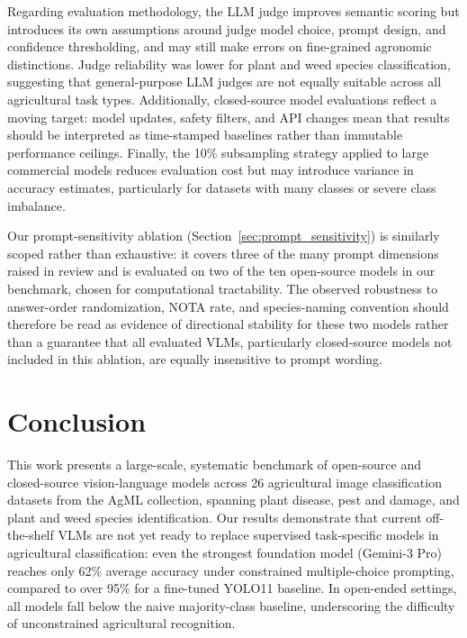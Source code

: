 \documentclass[10pt,letterpaper]{article}
\begin{document}
Regarding evaluation methodology, the LLM judge improves semantic scoring but introduces its own assumptions around judge model choice, prompt design, and confidence thresholding, and may still make errors on fine-grained agronomic distinctions. Judge reliability was lower for plant and weed species classification, suggesting that general-purpose LLM judges are not equally suitable across all agricultural task types. Additionally, closed-source model evaluations reflect a moving target: model updates, safety filters, and API changes mean that results should be interpreted as time-stamped baselines rather than immutable performance ceilings. Finally, the 10\% subsampling strategy applied to large commercial models reduces evaluation cost but may introduce variance in accuracy estimates, particularly for datasets with many classes or severe class imbalance.

Our prompt-sensitivity ablation (Section~\ref{sec:prompt_sensitivity}) is similarly scoped rather than exhaustive: it covers three of the many prompt dimensions raised in review and is evaluated on two of the ten open-source models in our benchmark, chosen for computational tractability. The observed robustness to answer-order randomization, NOTA rate, and species-naming convention should therefore be read as evidence of directional stability for these two models rather than a guarantee that all evaluated VLMs, particularly closed-source models not included in this ablation, are equally insensitive to prompt wording.

\section{Conclusion}
\label{sec:conclusion}
This work presents a large-scale, systematic benchmark of open-source and closed-source vision-language models across 26 agricultural image classification datasets from the AgML collection, spanning plant disease, pest and damage, and plant and weed species identification. Our results demonstrate that current off-the-shelf VLMs are not yet ready to replace supervised task-specific models in agricultural classification: even the strongest foundation model (Gemini-3 Pro) reaches only 62\% average accuracy under constrained multiple-choice prompting, compared to over 95\% for a fine-tuned YOLO11 baseline. In open-ended settings, all models fall below the naive majority-class baseline, underscoring the difficulty of unconstrained agricultural recognition.
\end{document}
